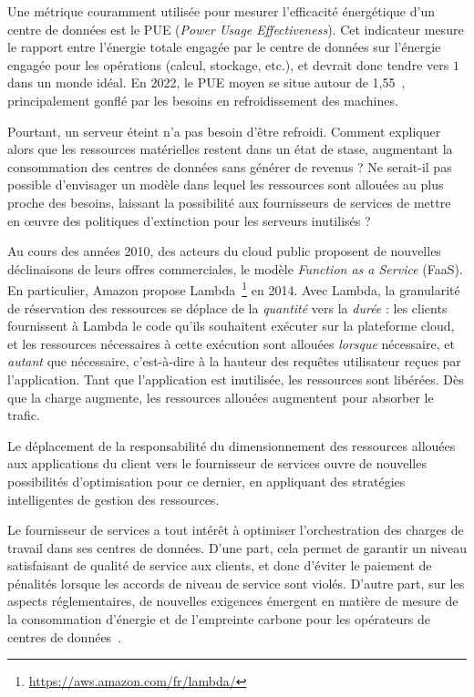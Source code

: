 Une métrique couramment utilisée pour mesurer l'efficacité énergétique d'un centre de données est le PUE (\textit{Power Usage Effectiveness}). Cet indicateur mesure le rapport entre l'énergie totale engagée par le centre de données sur l'énergie engagée pour les opérations (calcul, stockage, etc.), et devrait donc tendre vers $1$ dans un monde idéal. En 2022, le PUE moyen se situe autour de 1,55~\cite{davisUptimeInstituteGlobal2022}, principalement gonflé par les besoins en refroidissement des machines.

Pourtant, un serveur éteint n'a pas besoin d'être refroidi. Comment expliquer alors que les ressources matérielles restent dans un état de stase, augmentant la consommation des centres de données sans générer de revenus ? Ne serait-il pas possible d'envisager un modèle dans lequel les ressources sont allouées au plus proche des besoins, laissant la possibilité aux fournisseurs de services de mettre en œuvre des politiques d'extinction pour les serveurs inutilisés ?

Au cours des années 2010, des acteurs du cloud public proposent de nouvelles déclinaisons de leurs offres commerciales, le modèle \textit{Function as a Service} (FaaS). En particulier, Amazon propose Lambda~\footnote{\href{https://aws.amazon.com/fr/lambda/}{https://aws.amazon.com/fr/lambda/}} en 2014. Avec Lambda, la granularité de réservation des ressources se déplace de la \textit{quantité} vers la \textit{durée} : les clients fournissent à Lambda le code qu'ils souhaitent exécuter sur la plateforme cloud, et les ressources nécessaires à cette exécution sont allouées \textit{lorsque} nécessaire, et \textit{autant} que nécessaire, c'est-à-dire à la hauteur des requêtes utilisateur reçues par l'application. Tant que l'application est inutilisée, les ressources sont libérées. Dès que la charge augmente, les ressources allouées augmentent pour absorber le trafic.

Le déplacement de la responsabilité du dimensionnement des ressources allouées aux applications du client vers le fournisseur de services ouvre de nouvelles possibilités d'optimisation pour ce dernier, en appliquant des stratégies intelligentes de gestion des ressources.

Le fournisseur de services a tout intérêt à optimiser l'orchestration des charges de travail dans ses centres de données. D'une part, cela permet de garantir un niveau satisfaisant de qualité de service aux clients, et donc d'éviter le paiement de pénalités lorsque les accords de niveau de service sont violés. D'autre part, sur les aspects réglementaires, de nouvelles exigences émergent en matière de mesure de la consommation d'énergie et de l'empreinte carbone pour les opérateurs de centres de données~\cite{davisUptimeInstituteGlobal2022}.

